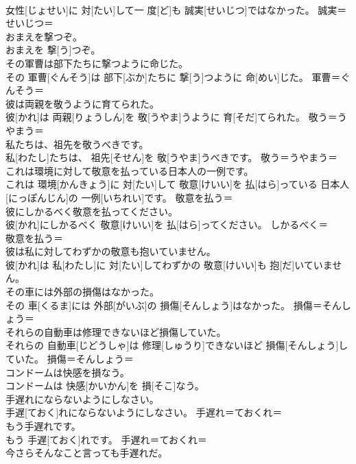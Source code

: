 \documentclass[8pt]{extreport}
\begin{document}
\begin{CJK}{UTF8}{min}
\\	女性[じょせい]に 対[たい]して一 度[ど]も 誠実[せいじつ]ではなかった。	誠実＝せいじつ＝ 
\\	おまえを撃つぞ。	
\\	おまえを 撃[う]つぞ。	
\\	その軍曹は部下たちに撃つように命じた。	
\\	その 軍曹[ぐんそう]は 部下[ぶか]たちに 撃[う]つように 命[めい]じた。	軍曹＝ぐんそう＝ 
\\	彼は両親を敬うように育てられた。	
\\	彼[かれ]は 両親[りょうしん]を 敬[うやま]うように 育[そだ]てられた。	敬う＝うやまう＝ 
\\	私たちは、祖先を敬うべきです。	
\\	私[わたし]たちは、 祖先[そせん]を 敬[うやま]うべきです。	敬う＝うやまう＝ 
\\	これは環境に対して敬意を払っている日本人の一例です。	
\\	これは 環境[かんきょう]に 対[たい]して 敬意[けいい]を 払[はら]っている 日本人[にっぽんじん]の 一例[いちれい]です。	敬意を払う＝ 
\\	彼にしかるべく敬意を払ってください。	
\\	彼[かれ]にしかるべく 敬意[けいい]を 払[はら]ってください。	しかるべく＝ 
\\	敬意を払う＝ 
\\	彼は私に対してわずかの敬意も抱いていません。	
\\	彼[かれ]は 私[わたし]に 対[たい]してわずかの 敬意[けいい]も 抱[だ]いていません。	
\\	その車には外部の損傷はなかった。	
\\	その 車[くるま]には 外部[がいぶ]の 損傷[そんしょう]はなかった。	損傷＝そんしょう＝ 
\\	それらの自動車は修理できないほど損傷していた。	
\\	それらの 自動車[じどうしゃ]は 修理[しゅうり]できないほど 損傷[そんしょう]していた。	損傷＝そんしょう＝ 
\\	コンドームは快感を損なう。	
\\	コンドームは 快感[かいかん]を 損[そこ]なう。	
\\	手遅れにならないようにしなさい。	
\\	手遅[ておく]れにならないようにしなさい。	手遅れ＝ておくれ＝ 
\\	もう手遅れです。	
\\	もう 手遅[ておく]れです。	手遅れ＝ておくれ＝ 
\\	今さらそんなこと言っても手遅れだ。	

\end{CJK}
\end{document}
